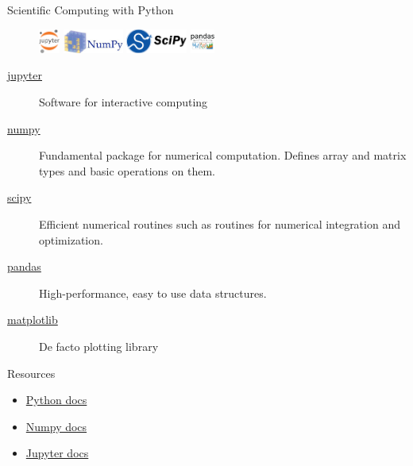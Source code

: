 \documentclass[aspectratio=169]{beamer}
\begin{document}
    \begin{frame}{Scientific Computing with Python}
        \begin{figure}
            \centering
            \includegraphics[height=0.8cm]{figures/jupyter-logo.png}
            \includegraphics[height=0.8cm]{figures/numpy-logo.jpeg}
            \includegraphics[height=0.8cm]{figures/scipy-logo.png}
            \includegraphics[height=0.8cm]{figures/pandas-logo.png}
        \end{figure}
        \begin{description}
            \item[\href{http://jupyter.org/}{jupyter}] Software for interactive computing
            \item[\href{http://www.scipy.org/}{numpy}] Fundamental package for numerical computation. Defines array and matrix types and basic operations on them.
            \item[\href{http://www.scipy.org/}{scipy}] Efficient numerical routines such as routines for numerical integration and optimization.
            \item[\href{http://pandas.pydata.org/}{pandas}] High-performance, easy to use data structures.        \item[\href{http://matplotlib.org/}{matplotlib}] De facto plotting library

        \end{description}
    \end{frame}

    \begin{frame}{Resources}
        \begin{itemize}
            \item \href{https://www.python.org/doc/ }{Python docs}
            \item \href{http://docs.scipy.org/doc/numpy/reference/ }{Numpy docs}
            \item \href{https://docs.jupyter.org/en/latest/start/index.html}{Jupyter docs}
        \end{itemize}
    \end{frame}
\end{document}
